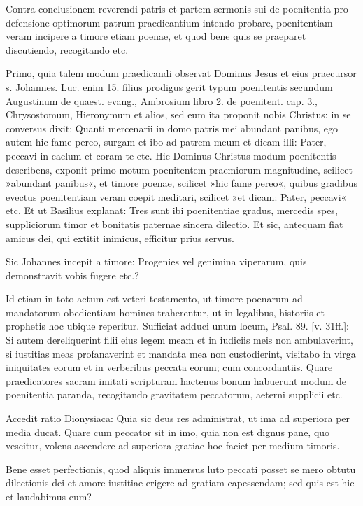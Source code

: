 Contra conclusionem reverendi patris et partem sermonis sui de poenitentia pro defensione optimorum patrum praedicantium intendo probare, poenitentiam veram incipere a timore etiam poenae, et quod bene quis se praeparet discutiendo, recogitando etc.

Primo, quia talem modum praedicandi observat Dominus Jesus et eius praecursor s. Johannes. Luc. enim 15. filius prodigus gerit typum poenitentis secundum Augustinum de quaest. evang., Ambrosium libro 2. de poenitent. cap. 3., Chrysostomum, Hieronymum et alios, sed eum ita proponit nobis Christus: in se conversus dixit: Quanti mercenarii in domo patris mei abundant panibus, ego autem hic fame pereo, surgam et ibo ad patrem meum et dicam illi: Pater, peccavi in caelum et coram te etc. Hic Dominus Christus modum poenitentis describens, exponit primo motum poenitentem praemiorum magnitudine, scilicet »abundant panibus«, et timore poenae, scilicet »hic fame pereo«, quibus gradibus evectus poenitentiam veram coepit meditari, scilicet »et dicam: Pater, peccavi« etc. Et ut Basilius explanat: Tres sunt ibi poenitentiae gradus, mercedis spes, suppliciorum timor et bonitatis paternae sincera dilectio. Et sic, antequam fiat amicus dei, qui extitit inimicus, efficitur prius servus.

Sic Johannes incepit a timore: Progenies vel genimina viperarum, quis demonstravit vobis fugere etc.?

Id etiam in toto actum est veteri testamento, ut timore poenarum ad mandatorum obedientiam homines traherentur, ut in legalibus, historiis et prophetis hoc ubique reperitur. Sufficiat adduci unum locum, Psal. 89. [v. 31ff.]: Si autem dereliquerint filii eius legem meam et in iudiciis meis non ambulaverint, si iustitias meas profanaverint et mandata mea non custodierint, visitabo in virga iniquitates eorum et in verberibus peccata eorum; cum concordantiis. Quare praedicatores sacram imitati scripturam hactenus bonum habuerunt modum de poenitentia paranda, recogitando gravitatem peccatorum, aeterni supplicii etc.

Accedit ratio Dionysiaca: Quia sic deus res administrat, ut ima ad superiora per media ducat. Quare cum peccator sit in imo, quia non est dignus pane, quo vescitur, volens ascendere ad superiora gratiae hoc faciet per medium timoris.

Bene esset perfectionis, quod aliquis immersus luto \marginpar{\small[360]} peccati posset se mero obtutu dilectionis dei et amore iustitiae erigere ad gratiam capessendam; sed quis est hic et laudabimus eum?

